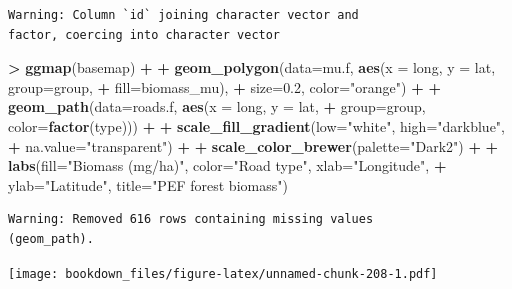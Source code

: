 \documentclass[
]{krantz}
\makeatletter
\newenvironment{Shaded}{\begin{snugshade}}{\end{snugshade}}
\newcommand{\DataTypeTok}[1]{\textcolor[rgb]{0.27,0.27,0.27}{#1}}
\newcommand{\FloatTok}[1]{\textcolor[rgb]{0.06,0.06,0.06}{#1}}
\newcommand{\KeywordTok}[1]{\textcolor[rgb]{0.27,0.27,0.27}{\textbf{#1}}}
\newcommand{\NormalTok}[1]{#1}
\newcommand{\OperatorTok}[1]{\textcolor[rgb]{0.43,0.43,0.43}{\textbf{#1}}}
\newcommand{\StringTok}[1]{\textcolor[rgb]{0.5,0.5,0.5}{#1}}
\newenvironment{kframe}{%
\medskip{}
\setlength{\fboxsep}{.8em}
 \def\at@end@of@kframe{}%
 \ifinner\ifhmode%
  \def\at@end@of@kframe{\end{minipage}}%
  \begin{minipage}{\columnwidth}%
 \fi\fi%
 \def\FrameCommand##1{\hskip\@totalleftmargin \hskip-\fboxsep
 \colorbox{shadecolor}{##1}\hskip-\fboxsep
     \hskip-\linewidth \hskip-\@totalleftmargin \hskip\columnwidth}%
 \MakeFramed {\advance\hsize-\width
   \@totalleftmargin\z@ \linewidth\hsize
   \@setminipage}}%
 {\par\unskip\endMakeFramed%
 \at@end@of@kframe}
\renewenvironment{Shaded}{\begin{kframe}}{\end{kframe}}
\makeatother
\begin{document}
\begin{verbatim}
Warning: Column `id` joining character vector and
factor, coercing into character vector
\end{verbatim}

\begin{Shaded}
\begin{Highlighting}[]
\OperatorTok{\textgreater{}}\StringTok{ }\KeywordTok{ggmap}\NormalTok{(basemap) }\OperatorTok{+}
\OperatorTok{+}\StringTok{     }\KeywordTok{geom\_polygon}\NormalTok{(}\DataTypeTok{data=}\NormalTok{mu.f, }\KeywordTok{aes}\NormalTok{(}\DataTypeTok{x =}\NormalTok{ long, }\DataTypeTok{y =}\NormalTok{ lat, }\DataTypeTok{group=}\NormalTok{group, }
\OperatorTok{+}\StringTok{                                 }\DataTypeTok{fill=}\NormalTok{biomass\_mu), }
\OperatorTok{+}\StringTok{                  }\DataTypeTok{size=}\FloatTok{0.2}\NormalTok{, }\DataTypeTok{color=}\StringTok{"orange"}\NormalTok{) }\OperatorTok{+}
\OperatorTok{+}\StringTok{     }\KeywordTok{geom\_path}\NormalTok{(}\DataTypeTok{data=}\NormalTok{roads.f, }\KeywordTok{aes}\NormalTok{(}\DataTypeTok{x =}\NormalTok{ long, }\DataTypeTok{y =}\NormalTok{ lat, }
\OperatorTok{+}\StringTok{                                 }\DataTypeTok{group=}\NormalTok{group, }\DataTypeTok{color=}\KeywordTok{factor}\NormalTok{(type))) }\OperatorTok{+}
\OperatorTok{+}\StringTok{     }\KeywordTok{scale\_fill\_gradient}\NormalTok{(}\DataTypeTok{low=}\StringTok{"white"}\NormalTok{, }\DataTypeTok{high=}\StringTok{"darkblue"}\NormalTok{, }
\OperatorTok{+}\StringTok{                         }\DataTypeTok{na.value=}\StringTok{"transparent"}\NormalTok{) }\OperatorTok{+}
\OperatorTok{+}\StringTok{     }\KeywordTok{scale\_color\_brewer}\NormalTok{(}\DataTypeTok{palette=}\StringTok{"Dark2"}\NormalTok{) }\OperatorTok{+}
\OperatorTok{+}\StringTok{     }\KeywordTok{labs}\NormalTok{(}\DataTypeTok{fill=}\StringTok{"Biomass (mg/ha)"}\NormalTok{, }\DataTypeTok{color=}\StringTok{"Road type"}\NormalTok{, }\DataTypeTok{xlab=}\StringTok{"Longitude"}\NormalTok{, }
\OperatorTok{+}\StringTok{          }\DataTypeTok{ylab=}\StringTok{"Latitude"}\NormalTok{, }\DataTypeTok{title=}\StringTok{"PEF forest biomass"}\NormalTok{)}
\end{Highlighting}
\end{Shaded}

\begin{verbatim}
Warning: Removed 616 rows containing missing values
(geom_path).
\end{verbatim}

\texttt{[image: bookdown\_files/figure-latex/unnamed-chunk-208-1.pdf]}
\end{document}
